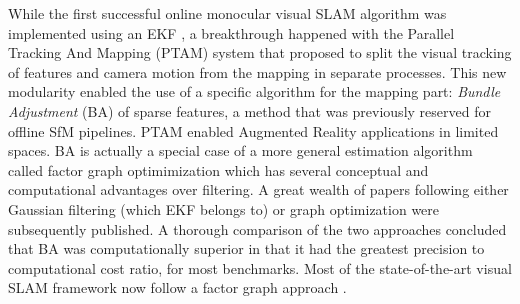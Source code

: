While the first successful online monocular visual SLAM algorithm was implemented using an EKF \cite{davison2007monoslam}, a breakthrough happened with the 
Parallel Tracking And Mapping (PTAM) system \cite{klein2009parallel} that proposed to split the visual tracking of features and camera motion from the 
mapping in separate processes. This new modularity enabled the use of a specific algorithm for the mapping part: \textit{Bundle Adjustment} (BA) 
\cite{triggs1999bundle, schoenberger2016sfm} of sparse features, a method that was previously reserved for offline SfM pipelines. 
PTAM enabled Augmented Reality applications in limited spaces. BA is actually a special case of a more general 
estimation algorithm called factor graph optimimization which has several conceptual and computational advantages over filtering.
A great wealth of papers following either Gaussian filtering (which EKF belongs to) or graph optimization were subsequently published. A thorough comparison 
of the two approaches \cite{strasdat2012visual} concluded that BA was computationally superior in that it had the greatest precision to 
computational cost ratio, for most benchmarks. Most of the state-of-the-art visual SLAM framework now follow a factor graph approach 
\cite{forster2017-TRO, mur2015orb, qin2018vins, leutenegger2015keyframe, ferrera2021ov}.

